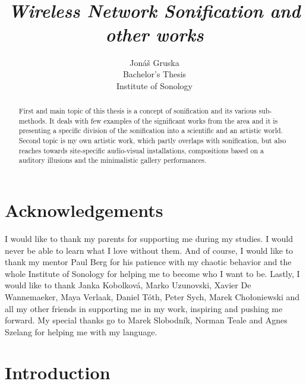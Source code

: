 \documentclass[12pt,a4paper,oneside]{report}
\title{
{\fontsize{43}{30}\selectfont \color{red}\sc{Streams~\&~Currents}}\\
{\fontsize{15}{15}\selectfont \emph{Wireless Network Sonification and other works}} 
}
\author{Jonáš Gruska\\
Bachelor's Thesis\\
Institute of Sonology}
\date{}
\begin{document}
\frenchspacing
\raggedbottom
{}       %

\maketitle

\begin{abstract}
First and main topic of this thesis is a concept of sonification and its various sub-methods. It deals with few examples of the significant works from the area and it is presenting a specific division of the sonification into a scientific and an artistic world.
Second topic is my own artistic work, which partly overlaps with sonification, but also reaches towards site-specific audio-visual installations, compositions based on a auditory illusions and the minimalistic gallery performances. 
\end{abstract}
\clearpage
\setcounter{page}{3}


\chapter*{Acknowledgements}
I would like to thank my parents for supporting me during my studies. I would never be able to learn what I love without them. And of course, I would like to thank my mentor Paul Berg for his patience with my chaotic behavior and the whole Institute of Sonology for helping me to become who I want to be. Lastly, I would like to thank Janka Kobolková, Marko Uzunovski, Xavier De \mbox{Wannemaeker}, Maya Verlaak, Daniel Tóth, Peter Sych, Marek Chołoniewski and all my other friends in supporting me in my work, inspiring and pushing me forward. My special thanks go to Marek Slobodník, Norman Teale and Agnes Szelang for helping me with my language.

\hypersetup{linkcolor=black} 
\setcounter{tocdepth}{1}
\tableofcontents
\hypersetup{linkcolor=red}


\chapter{Introduction}
\end{document}
